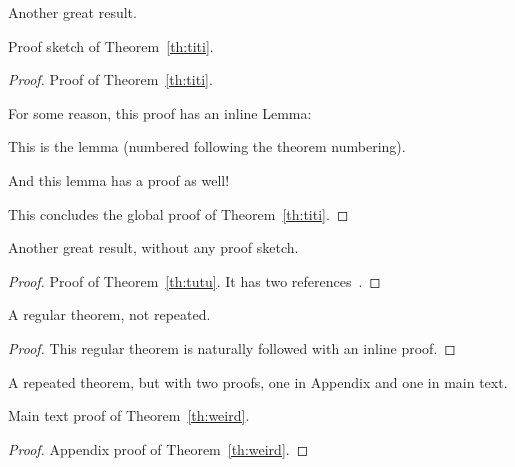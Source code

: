 \begin{theoremrep}
  \label{th:titi}
  Another great result.
\end{theoremrep}

\begin{proofsketch}
  Proof sketch of Theorem~\ref{th:titi}.
\end{proofsketch}

\begin{proof}
  Proof of Theorem~\ref{th:titi}.

  For some reason, this proof has an inline Lemma:
  \begin{lemma}
    This is the lemma (numbered following the theorem numbering).
  \end{lemma} 

  \begin{nestedproof}
    And this lemma has a proof as well!
  \end{nestedproof}

  This concludes the global proof of Theorem~\ref{th:titi}.
\end{proof}

\begin{theoremrep}
  \label{th:tutu}
  Another great result, without any proof sketch.
\end{theoremrep}

\begin{proof}
  Proof of Theorem~\ref{th:tutu}. It has two
  references~\cite{sitemaps,brin1998anatomy}.
\end{proof}

\begin{theorem}
  A regular theorem, not repeated.
\end{theorem}

\begin{proof}
This regular theorem is naturally followed with an inline proof.
\end{proof}

\begin{theoremrep}
  \label{th:weird}
  A repeated theorem, but with two proofs, one in Appendix and one in
  main text.
\end{theoremrep}

\begin{inlineproof}
  Main text proof of Theorem~\ref{th:weird}.
\end{inlineproof}

\begin{proof}
  Appendix proof of Theorem~\ref{th:weird}.
\end{proof}

